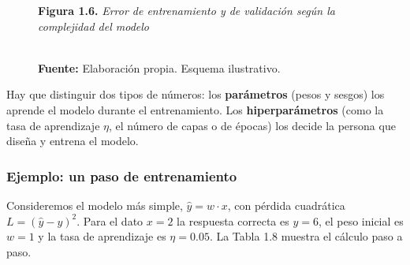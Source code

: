 \begin{figure}[htpb!]
\centering
\begin{tcolorbox}[colback=white, colframe=unmsm_gold, arc=3pt, boxrule=0.8pt, top=0.3cm, bottom=0.3cm, left=0.4cm, right=0.4cm]
\centering
\small\sffamily
\textbf{Figura 1.6.} \textit{Error de entrenamiento y de validación según la complejidad del modelo}\\[0.25cm]
\\[0.2cm]
\raggedright\scriptsize \textbf{Fuente:} Elaboración propia. Esquema ilustrativo.
\end{tcolorbox}
\end{figure}

Hay que distinguir dos tipos de números: los \textbf{parámetros} (pesos y sesgos) los aprende el modelo durante el entrenamiento. Los \textbf{hiperparámetros} (como la tasa de aprendizaje $\eta$, el número de capas o de épocas) los decide la persona que diseña y entrena el modelo.

\subsubsection{Ejemplo: un paso de entrenamiento}
Consideremos el modelo más simple, $\hat{y} = w \cdot x$, con pérdida cuadrática $L = (\hat{y} - y)^2$. Para el dato $x = 2$ la respuesta correcta es $y = 6$, el peso inicial es $w = 1$ y la tasa de aprendizaje es $\eta = 0.05$. La Tabla 1.8 muestra el cálculo paso a paso.

